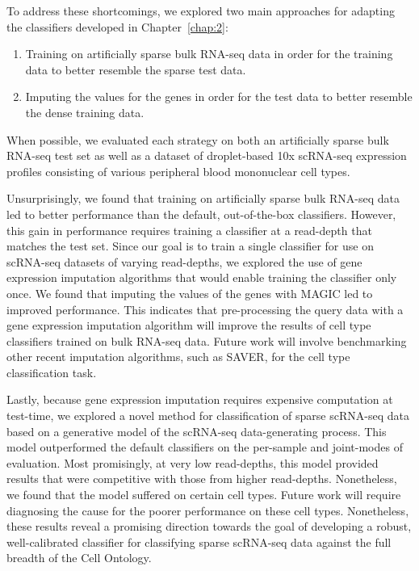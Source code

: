 To address these shortcomings, we explored two main approaches for adapting the classifiers developed in Chapter~\ref{chap:2}:
\begin{enumerate}
\item Training on artificially sparse bulk RNA-seq data in order for the training data to better resemble the sparse test data.
\item Imputing the values for the genes in order for the test data to better resemble the dense training data.
\end{enumerate}
When possible, we evaluated each strategy on both an artificially sparse bulk RNA-seq test set as well as a dataset of droplet-based 10x scRNA-seq expression profiles consisting of various peripheral blood mononuclear cell types. 

Unsurprisingly, we found that training on artificially sparse bulk RNA-seq data led to better performance than the default, out-of-the-box classifiers.  However, this gain in performance requires training a classifier at a read-depth that matches the test set. Since our goal is to train a single classifier for use on scRNA-seq datasets of varying read-depths, we explored the use of gene expression imputation algorithms that would enable training the classifier only once. We found that imputing the values of the genes with MAGIC led to improved performance.  This indicates that pre-processing the query data with a gene expression imputation algorithm will improve the results of cell type classifiers trained on bulk RNA-seq data.  Future work will involve benchmarking other recent imputation algorithms, such as SAVER, for the cell type classification task. 

 Lastly, because gene expression imputation requires expensive computation at test-time, we explored a novel method for classification of sparse scRNA-seq data based on a generative model of the scRNA-seq data-generating process. This model outperformed the default classifiers on the per-sample and joint-modes of evaluation.  Most promisingly, at very low read-depths, this model provided results that were competitive with those from higher read-depths. Nonetheless, we found that the model suffered on certain cell types. Future work will require diagnosing the cause for the poorer performance on these cell types. Nonetheless, these results reveal a promising direction towards the goal of developing a robust, well-calibrated classifier for classifying sparse scRNA-seq data against the full breadth of the Cell Ontology.  


 





